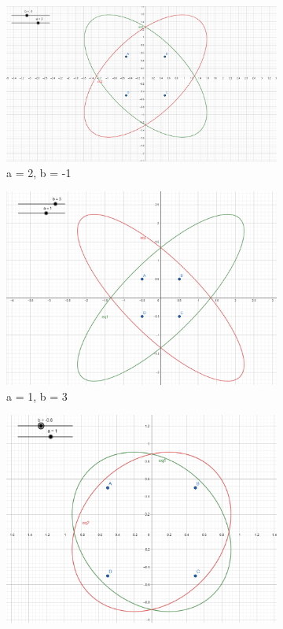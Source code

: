 \documentclass{article}
\begin{document}
\begin{figure}[!ht]
  \centering
  \begin{subfigure}[b]{0.3\linewidth}
    \includegraphics[width=\linewidth]{image/square_illustrator_1.png}
    \caption{a = 2, b = -1}
  \end{subfigure}
  \begin{subfigure}[b]{0.3\linewidth}
    \includegraphics[width=\linewidth]{image/square_illustrator_2.png}
    \caption{a = 1, b = 3}
  \end{subfigure}
  \begin{subfigure}[b]{0.3\linewidth}
    \includegraphics[width=\linewidth]{image/square_illustrator_3.png}

\end{subfigure}
\end{figure}
\end{document}
